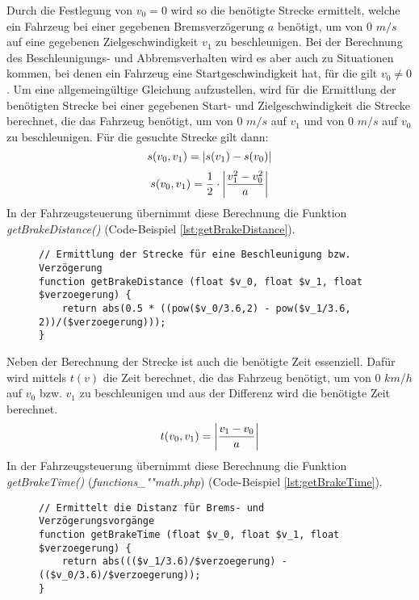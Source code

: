 Durch die Festlegung von $v_{0} = 0$ wird so die benötigte Strecke ermittelt, welche ein Fahrzeug bei einer gegebenen Bremsverzögerung $a$ benötigt, um von 0 $m/s$ auf eine gegebenen Zielgeschwindigkeit $v_{1}$ zu beschleunigen. Bei der Berechnung des Be\-schleu\-ni\-gungs- und Abbremsverhalten wird es aber auch zu Situationen kommen, bei denen ein Fahrzeug eine Startgeschwindigkeit hat, für die gilt $v_{0} \neq 0$. Um eine allgemeingültige Gleichung aufzustellen, wird für die Ermittlung der benötigten Strecke bei einer gegebenen Start- und Zielgeschwindigkeit die Strecke berechnet, die das Fahrzeug benötigt, um von 0 $m/s$ auf $v_{1}$ und von 0 $m/s$ auf $v_{0}$ zu beschleunigen. Für die gesuchte Strecke gilt dann: 
\begin{equation}
s(v_{0}, v_{1}) = \left\vert s(v_{1}) - s(v_{0})\right\vert 
\end{equation}
\begin{equation}
\label{eq:s_v_ges}
s(v_{0}, v_{1}) =\frac{1}{2} \cdot\left\vert\frac{v_{1}^{2} - v_{0}^{2}}{a}\right\vert
\end{equation}
In der Fahrzeugsteuerung übernimmt diese Berechnung die Funktion \textit{get\-Brake\-Dis\-tance()} (Code-Beispiel \ref{lst:getBrakeDistance}). 
\begin{figure}[H]
\begin{lstlisting}[caption={\textit{getBrakeDistance$($$)$} (\textit{functions\_math.php})},captionpos=b,label={lst:getBrakeDistance}]
// Ermittlung der Strecke für eine Beschleunigung bzw. Verzögerung
function getBrakeDistance (float $v_0, float $v_1, float $verzoegerung) {
	return abs(0.5 * ((pow($v_0/3.6,2) - pow($v_1/3.6, 2))/($verzoegerung)));
}
\end{lstlisting}
\end{figure}
\noindent Neben der Berechnung der Strecke ist auch die benötigte Zeit essenziell. Dafür wird mittels $t(v)$ die Zeit berechnet, die das Fahrzeug benötigt, um von 0 $km/h$ auf $v_{0}$ bzw. $v_{1}$ zu beschleunigen und aus der Differenz wird die benötigte Zeit berechnet.
\begin{equation}
\label{eq:t_v_ges}
t(v_{0}, v_{1}) = \left\vert\frac{v_{1} - v_{0}}{a}\right\vert
\end{equation}
In der Fahrzeugsteuerung übernimmt diese Berechnung die Funktion \textit{getBrakeTime()} (\textit{func\-tions\_""math\-.php}) (Code-Beispiel \ref{lst:getBrakeTime}).
\begin{figure}[H]
\begin{lstlisting}[caption={\textit{getBrakeTime$($$)$} (\textit{functions\_math.php})},captionpos=b,label={lst:getBrakeTime}]
// Ermittelt die Distanz für Brems- und Verzögerungsvorgänge
function getBrakeTime (float $v_0, float $v_1, float $verzoegerung) {
	return abs((($v_1/3.6)/$verzoegerung) - (($v_0/3.6)/$verzoegerung));
}
\end{lstlisting}
\end{figure}
